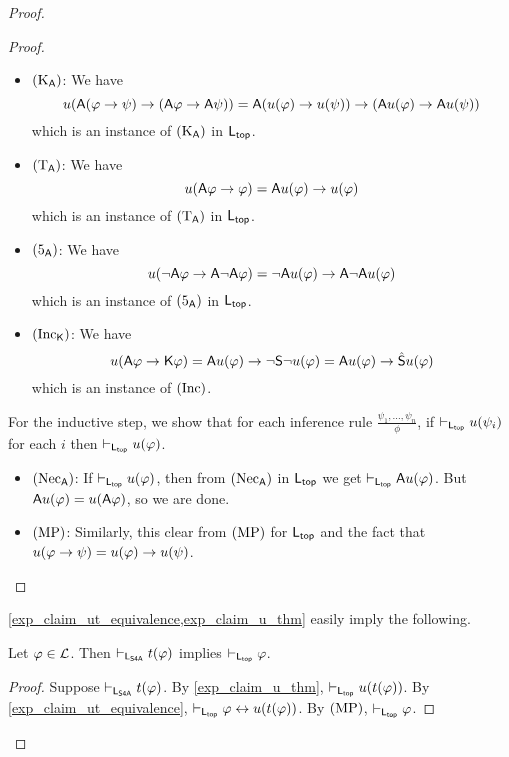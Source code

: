 \begin{proof}
\begin{proof}
\begin{itemize}
        \item $(\text{K}_{\mathsf{A}})$: We have
        \[
        u(\mathsf{A}(\varphi \to \psi) \to (\mathsf{A}\varphi \to \mathsf{A}\psi))
=
\mathsf{A} (u(\varphi) \to u(\psi)) \to (\mathsf{A} u(\varphi) \to \mathsf{A} u(\psi))\]
        which is an instance of $(\text{K}_{\mathsf{A}})$ in $\mathsf{L}_{\mathsf{top}}$.

        \item $(\text{T}_{\mathsf{A}})$: We have
        \[
        u(\mathsf{A}\varphi \to \varphi)
=
\mathsf{A} u(\varphi) \to u(\varphi)\]
        which is an instance of $(\text{T}_{\mathsf{A}})$ in $\mathsf{L}_{\mathsf{top}}$.

        \item $(\text{5}_{\mathsf{A}})$: We have
        \[
        u(\neg\mathsf{A}\varphi \to \mathsf{A}\neg\mathsf{A}\varphi)
=
\neg\mathsf{A} u(\varphi) \to \mathsf{A} \neg\mathsf{A} u(\varphi)\]
        which is an instance of $(\text{5}_{\mathsf{A}})$ in $\mathsf{L}_{\mathsf{top}}$.

        \item $(\text{Inc}_{\mathsf{K}})$: We have
        \[
        u(\mathsf{A}\varphi \to \mathsf{K}\varphi)
=
\mathsf{A} u(\varphi) \to \neg\mathsf{S}\neg u(\varphi)
=
\mathsf{A} u(\varphi) \to \hat{\mathsf{S}} u(\varphi)\]
        which is an instance of $(\text{Inc})$.

        \end{itemize}
    For the inductive step, we show that for each inference rule
$\frac{\psi_1,\ldots,\psi_n}{\phi}$, if
$\vdash_{\mathsf{L}_{\mathsf{top}}}u(\psi_i)$ for each $i$ then
$\vdash_{\mathsf{L}_{\mathsf{top}}}u(\varphi)$.

    \begin{itemize}
    \item $(\text{Nec}_{\mathsf{A}})$: If $\vdash_{\mathsf{L}_{\mathsf{top}}} u(\varphi)$, then from
$(\text{Nec}_{\mathsf{A}})$ in $\mathsf{L}_{\mathsf{top}}$ we get
$\vdash_{\mathsf{L}_{\mathsf{top}}} \mathsf{A} u(\varphi)$. But $\mathsf{A} u(\varphi) =
u(\mathsf{A}\varphi)$, so we are done.

        \item $(\text{MP})$: Similarly, this clear from $(\text{MP})$ for
$\mathsf{L}_{\mathsf{top}}$ and the fact that $u(\varphi \to \psi) =
u(\varphi) \to u(\psi)$.
        \end{itemize}
    \end{proof}

\cref{exp_claim_ut_equivalence,exp_claim_u_thm} easily imply the following.

\begin{claim}
\label{exp_claim_t_thm}

Let $\varphi \in \mathcal{L}$. Then
$\vdash_{\mathsf{L}_{\mathsf{S4A}}} t(\varphi)$ implies $\vdash_{\mathsf{L}_{\mathsf{top}}}
\varphi$.

\end{claim}

    \begin{proof}
    Suppose $\vdash_{\mathsf{L}_{\mathsf{S4A}}} t(\varphi)$. By \cref{exp_claim_u_thm},
$\vdash_{\mathsf{L}_{\mathsf{top}}} u(t(\varphi))$. By \cref{exp_claim_ut_equivalence},
$\vdash_{\mathsf{L}_{\mathsf{top}}} \varphi \leftrightarrow u(t(\varphi))$. By
$(\text{MP})$, $\vdash_{\mathsf{L}_{\mathsf{top}}} \varphi$.
    \end{proof}


\end{proof}
